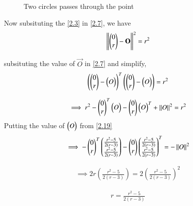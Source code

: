 \documentclass[journal,12pt,twocolumn]{IEEEtran}
\begin{document}
\begin{figure}[!htb]
	\centering
	\resizebox{\columnwidth}{!}{}
	\caption{Two circles passes through the point}
\end{figure}


Now subsituting the \ref{2.3} in \ref{2.7}, we have
\begin{align}
\left\lVert  \begin{pmatrix} 0 \\ r \\\end{pmatrix} - \mathbf{O}\right\rVert^{2} = r^{2} \label{2.20}
\end{align}

subsituting the value of $\vec{O}$ in \ref{2.7} and simplify,
\begin{align}
\begin{pmatrix}\begin{pmatrix}0 \\ r \\\end{pmatrix} - \begin{pmatrix}O\end{pmatrix}\end{pmatrix}^T\begin{pmatrix}\begin{pmatrix}0 \\ r \\\end{pmatrix} - \begin{pmatrix}O\end{pmatrix}\end{pmatrix} = r^2 \label{2.21}
\end{align}


\begin{align}
 \implies r^2 - \begin{pmatrix}0 \\ r\end{pmatrix}^T\begin{pmatrix}O\end{pmatrix}  -  \begin{pmatrix}0\\ r\\\end{pmatrix} \begin{pmatrix}O\end{pmatrix}^T +\left\lVert O\right\rVert^2 = r^2 \label{2.22.1}
\end{align}
Putting the value  of $\begin{pmatrix}O\end{pmatrix}$ from \ref{2.19}
\begin{align}
\implies - \begin{pmatrix}0 \\ r\end{pmatrix}^T\begin{pmatrix} \frac{r^2 - 5}{2 \left(r - 3\right)} \\ \frac{r^2 - 5}{2 \left(r - 3\right)} \\\end{pmatrix}  -  \begin{pmatrix}0 \\ r\end{pmatrix} \begin{pmatrix} \frac{r^2 - 5}{2 \left(r - 3\right)} \\ \frac{r^2 - 5}{2 \left(r - 3\right)} \\\end{pmatrix}^T    = -  \left\lVert O\right\rVert^2 \label{2.22.2}
\end{align}


\begin{align}
\implies 2r \left( \frac{r^2 - 5}{2 \left(r - 3\right)} \right) = 2 \left( \frac{r^2 - 5}{2 \left(r - 3\right)} \right)^2 
\end{align}



\begin{align}
r  =  \frac{r^2 - 5}{2 \left(r - 3\right)} 
\end{align}
\end{document}

